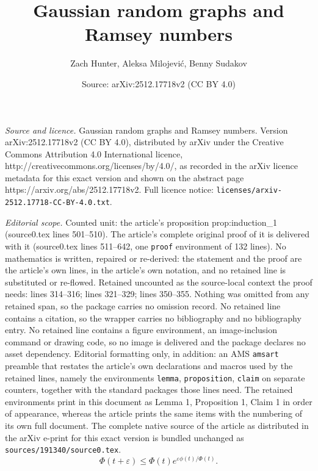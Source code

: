 \documentclass[10pt,a4paper]{amsart}
\title{\vspace{-0.9cm} Gaussian random graphs and Ramsey numbers}
\author{Zach Hunter, Aleksa Milojevi\'c, Benny Sudakov}
\date{Source: arXiv:2512.17718v2 (CC BY 4.0)}
\def\eps{\varepsilon}
\begin{document}
\maketitle

\noindent\emph{Source and licence.} \vspace{-0.9cm} Gaussian random graphs and Ramsey numbers. Version arXiv:2512.17718v2 (CC BY 4.0), distributed by arXiv under the Creative Commons Attribution 4.0 International licence, http://creativecommons.org/licenses/by/4.0/, as recorded in the arXiv licence metadata for this exact version and shown on the abstract page https://arxiv.org/abs/2512.17718v2. Full licence notice: \texttt{licenses/arxiv-2512.17718-CC-BY-4.0.txt}.\par\smallskip

\noindent\textit{Editorial scope.} Counted unit: the article's proposition prop:induction\_1 (source0.tex lines 501--510). The article's complete original proof of it is delivered with it (source0.tex lines 511--642, one \texttt{proof} environment of 132 lines). No mathematics is written, repaired or re-derived: the statement and the proof are the article's own lines, in the article's own notation, and no retained line is substituted or re-flowed.  Retained uncounted as the source-local context the proof needs: lines 314--316; lines 321--329; lines 350--355.  Nothing was omitted from any retained span, so the package carries no omission record.  No retained line contains a citation, so the wrapper carries no bibliography and no bibliography entry.  No retained line contains a figure environment, an image-inclusion command or drawing code, so no image is delivered and the package declares no asset dependency.  Editorial formatting only, in addition: an AMS \texttt{amsart} preamble that restates the article's own declarations and macros used by the retained lines, namely the environments \texttt{lemma}, \texttt{proposition}, \texttt{claim} on separate counters, together with the standard packages those lines need.  The retained environments print in this document as Lemma 1, Proposition 1, Claim 1 in order of appearance, whereas the article prints the same items with the numbering of its own full document.  The complete native source of the article as distributed in the arXiv e-print for this exact version is bundled unchanged as \texttt{sources/191340/source0.tex}.
\begin{equation}\label{eqn:log_concavity}
    \Phi(t+\eps)\leq \Phi(t)e^{\eps\phi(t)/\Phi(t)}.
\end{equation}
\end{document}
